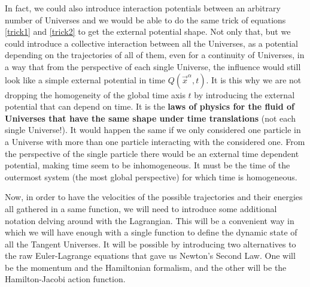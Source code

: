 \documentclass[11pt, a4paper]{article} %
\begin{document}
{In fact, we could also introduce interaction potentials between an arbitrary number of Universes and we would be able to do the same trick of equations \eqref{trick1} and \eqref{trick2} to get the external potential shape. Not only that, but we could introduce a collective interaction between all the Universes, as a potential depending on the trajectories of all of them, even for a continuity of Universes, in a way that from the perspective of each single Universe, the influence would still look like a simple external potential in time $Q(\vec{x}^\alpha,t)$. It is this why we are not dropping the homogeneity of the global time axis $t$ by introducing the external potential that can depend on time. It is the {\bf laws of physics for the fluid of Universes that have the same shape under time translations} (not each single Universe!). It would happen the same if we only considered one particle in a Universe with more than one particle interacting with the considered one. From the perspective of the single particle there would be an external time dependent potential, making time seem to be inhomogeneous. It must be the time of the outermost system (the most global perspective) for which time is homogeneous.
}

Now, in order to have the velocities of the possible trajectories and their energies all gathered in a same function, we will need to introduce some additional notation delving around with the Lagrangian. This will be a convenient way in which we will have enough with a single function to define the dynamic state of all the Tangent Universes. It will be possible by introducing two alternatives to the raw Euler-Lagrange equations that gave us Newton's Second Law. One will be the momentum and the Hamiltonian formalism, and the other will be the Hamilton-Jacobi action function.
\end{document}
